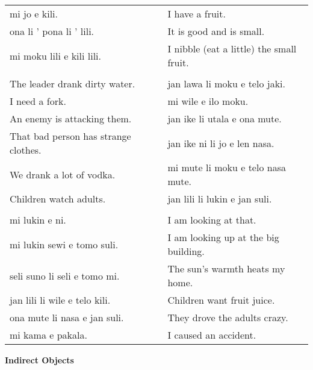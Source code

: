 \begin{supertabular}{p{5,5cm}|ll}
mi jo e kili.  &&  I have a fruit. \\
ona li ' pona li ' lili. && It is good and is small. \\
mi moku lili e kili lili.  && I nibble (eat a little) the small fruit. \\
 && \\ %
The leader drank dirty water.  && jan lawa li moku e telo jaki. \\ %
I need a fork.  && mi wile e ilo moku. \\ %
An enemy is attacking them. && jan ike li utala e ona mute. \\ %
That bad person has strange clothes.  && jan ike ni li jo e len nasa. \\ %
We drank a lot of vodka.  && mi mute li moku e telo nasa mute. \\ %
Children watch adults.  && jan lili li lukin e jan suli. \\ %
 && \\ %
mi lukin e ni. && I am looking at that. \\ 
mi lukin sewi e tomo suli.  && I am looking up at the big building. \\
seli suno li seli e tomo mi.  && The sun's warmth heats my home.  \\
jan lili li wile e telo kili.  && Children want fruit juice. \\
ona mute li nasa e jan suli.  && They drove the adults crazy. \\
mi kama e pakala. && I caused an accident. \\
\end{supertabular} 

\textbf{Indirect Objects} 
\label{'indirect_objects'}

